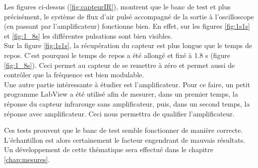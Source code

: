 Les figures ci-dessus (\ref{fig:capteurIR}), montrent que le banc de test et plus précisément, le système de flux d'air pulsé accompagné de
la sortie à l'oscilloscope (en passant par l'amplificateur) fonctionne bien. En effet, sur les figures \ref*{fig:1s1s} et \ref*{fig:1_8s}
les différentes pulsations sont bien visibles.\\

Sur la figure \ref{fig:1s1s}, la récupération du capteur est plus longue que le temps de repos. C'est pourquoi le temps de repos a été allongé
et fixé à 1.8 s (figure \ref*{fig:1_8s}). Ceci permet au capteur de se remettre à zéro et permet aussi de contrôler que la fréquence est bien
modulable. \\

Une autre partie intéressante à étudier est l'amplificateur. Pour ce faire, un petit programme LabView a été utilisé afin de mesurer, dans un
premier temps, la réponse du capteur \gls{infrarouge} sans amplificateur, puis, dans un second temps, la réponse avec amplificateur. Ceci nous
permettra de qualifier l'amplificateur.

Ces tests prouvent que le banc de test semble fonctionner de manière correcte. L'échantillon est alors certainement le facteur engendrant de
mauvais résultats. Un développement de cette thématique sera effectué dans le chapitre \ref{chap:mesures}.


